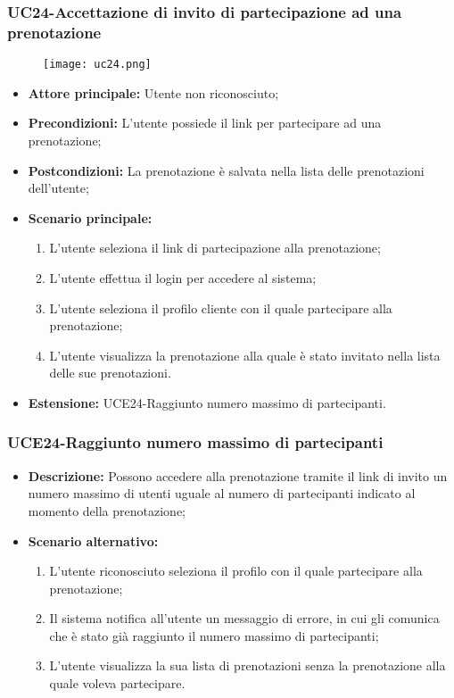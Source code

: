 \pagebreak
\subsubsection{UC24-Accettazione di invito di partecipazione ad una prenotazione}
\begin{figure}[h] \texttt{[image: uc24.png]} \end{figure}
\begin{itemize}
    \item \textbf{Attore principale:} Utente non riconosciuto;
    \item \textbf{Precondizioni:} L'utente possiede il link per partecipare ad una prenotazione;
    \item \textbf{Postcondizioni:} La prenotazione è salvata nella lista delle prenotazioni dell'utente;
    \item \textbf{Scenario principale:}
        \begin{enumerate}
            \item L'utente seleziona il link di partecipazione alla prenotazione;
            \item L'utente effettua il login per accedere al sistema;
            \item L'utente seleziona il profilo cliente con il quale partecipare alla prenotazione;
            \item L'utente visualizza la prenotazione alla quale è stato invitato nella lista delle sue prenotazioni.
        \end{enumerate}
        \item \textbf{Estensione:} UCE24-Raggiunto numero massimo di partecipanti.
    \end{itemize}

\subsubsection{UCE24-Raggiunto numero massimo di partecipanti}
\begin{itemize}
    \item \textbf{Descrizione:} Possono accedere alla prenotazione tramite il link di invito un numero massimo di utenti uguale al numero di partecipanti indicato al momento della prenotazione;
    \item \textbf{Scenario alternativo:}
    \begin{enumerate}
        \item L'utente riconosciuto seleziona il profilo con il quale partecipare alla prenotazione;
        \item Il sistema notifica all'utente un messaggio di errore, in cui gli comunica che è stato già raggiunto il numero massimo di partecipanti; %
        \item L'utente visualizza la sua lista di prenotazioni senza la prenotazione alla quale voleva partecipare.
    \end{enumerate}
\end{itemize}

